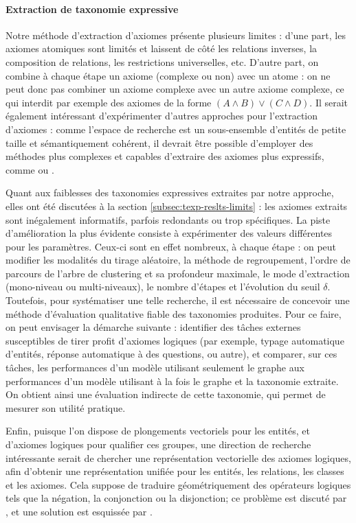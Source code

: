 \paragraph{Extraction de taxonomie expressive}


Notre méthode d'extraction d'axiomes présente plusieurs limites : d'une part, les axiomes atomiques sont limités et laissent de côté les relations inverses, la composition de relations, les restrictions universelles, etc. D'autre part, on combine à chaque étape un axiome (complexe ou non) avec un atome : on ne peut donc pas combiner un axiome complexe avec un autre axiome complexe, ce qui interdit par exemple des axiomes de la forme $(A \land B) \lor (C \land D)$. Il serait également intéressant d'expérimenter d'autres approches pour l'extraction d'axiomes : comme l'espace de recherche est un sous-ensemble d'entités de petite taille et sémantiquement cohérent, il devrait être possible d'employer des méthodes plus complexes et capables d'extraire des axiomes plus expressifs, comme \cite{vlog2019carral} ou \cite{lajus2020amie}.

Quant aux faiblesses des taxonomies expressives extraites par notre approche, elles ont été discutées à la section \ref{subsec:texp-reslts-limits} : les axiomes extraits sont inégalement informatifs, parfois redondants ou trop spécifiques. La piste d'amélioration la plus évidente consiste à expérimenter des valeurs différentes pour les paramètres. Ceux-ci sont en effet nombreux, à chaque étape : on peut modifier les modalités du tirage aléatoire, la méthode de regroupement, l'ordre de parcours de l'arbre de clustering et sa profondeur maximale, le mode d'extraction (mono-niveau ou multi-niveaux), le nombre d'étapes et l'évolution du seuil $\delta$. Toutefois, pour systématiser une telle recherche, il est nécessaire de concevoir une méthode d'évaluation qualitative fiable des taxonomies produites. Pour ce faire, on peut envisager la démarche suivante : identifier des tâches externes susceptibles de tirer profit d'axiomes logiques (par exemple, typage automatique d'entités, réponse automatique à des questions, ou autre), et comparer, sur ces tâches, les performances d'un modèle utilisant seulement le graphe aux performances d'un modèle utilisant à la fois le graphe et la taxonomie extraite. On obtient ainsi une évaluation indirecte de cette taxonomie, qui permet de mesurer son utilité pratique.



Enfin, puisque l'on dispose de plongements vectoriels pour les entités, et d'axiomes logiques pour qualifier ces groupes, une direction de recherche intéressante serait de chercher une représentation vectorielle des axiomes logiques, afin d'obtenir une représentation unifiée pour les entités, les relations, les classes et les axiomes. 
Cela suppose de traduire géométriquement des opérateurs logiques tels que la négation, la conjonction ou la disjonction; ce problème est discuté par
\cite{gutierrez2018knowledge}, et une solution est esquissée par \cite{hao2019universal}.
